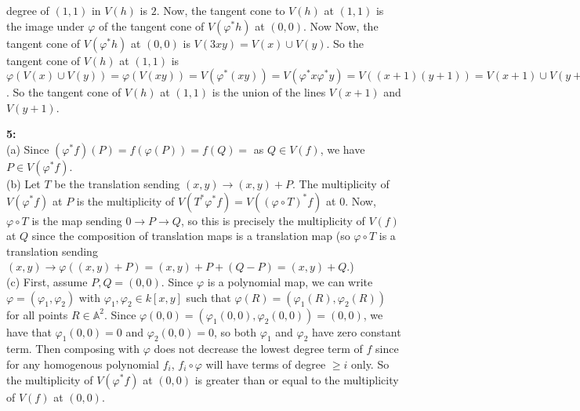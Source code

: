 \documentclass[a4paper]{article}
\begin{document}
 degree of $(1,1)$ in $V(h)$ is $2$. Now, the tangent cone
 to $V(h)$ at $(1,1)$ is
the image under $\varphi$ of the tangent cone of
$V\left( \varphi^{*}h \right) $ at $(0,0)$. Now
Now, the tangent cone of $V\left( \varphi^{*}h \right) $ at $(0,0)$ is
$V\left( 3xy \right) = V(x) \cup V(y)$. So the tangent cone of $V(h)$ at
$(1,1)$ is
$\varphi \left( V(x) \cup V(y) \right) 
= \varphi \left( V(xy) \right) = V\left( \varphi^{*}(xy) \right) 
= V\left( \varphi^{*}x \varphi^{*}y \right) 
= V\left( (x+1) (y+1) \right) = V(x+1) \cup V(y+1)
= \left\{ (x,y)  \mid x,y \in \mathbb{C}, x= -1 \lor y=-1 \right\} $.
So the tangent cone of $V(h)$ at $(1,1)$ is the union of the lines
$V(x+1)$ and $V(y+1)$.






\textbf{5:}\\
(a) Since $(\varphi^{*}f) (P) = f\left( \varphi(P) \right) 
= f(Q) = $ as $Q \in V(f)$, we have $P \in V\left( \varphi^{*}f \right) $.\\
\linebreak
(b) Let $T$ be the translation sending $(x,y) \to (x,y) + P$.
The multiplicity of $V \left( \varphi^{*}f \right) $ at $P $ is the
multiplicity of $V\left( T^{*}\varphi^{*}f \right) = V\left( \left( \varphi
\circ T \right)^{*} f \right) $ at $0$. Now,
$\varphi \circ T$ is the map sending $0 \to P \to Q$, so
this is precisely the multiplicity of $V(f)$ at $Q$ since the composition of
translation maps is a translation map (so $\varphi \circ T$ is a translation
sending $(x,y) \to \varphi ((x,y) + P) = (x,y) + P + (Q-P) = (x,y) + Q$.)\\
\linebreak
(c) First, assume $P, Q = (0,0)$. Since $\varphi$ is a polynomial map, we can
write $\varphi = \left( \varphi_1, \varphi_2 \right) $ with 
$\varphi_1, \varphi_2 \in k\left[ x,y \right] $ such that
$\varphi (R) = \left( \varphi_1 (R), \varphi_2(R) \right) $ for all points
$R \in \mathbb{A}^2$. Since $\varphi(0,0) = \left( \varphi_1 (0,0),
\varphi_2(0,0) \right)   =  (0,0)$, we have that
$\varphi_1 (0,0) = 0$ and $\varphi_2 (0,0) = 0$, so both $\varphi_1$ and
$\varphi_2$ have zero constant term. Then composing with $\varphi$ does
not decrease the lowest degree term of $f$ since for any
homogenous polynomial $f_i$, $f_i \circ \varphi$ will have terms of degree $\ge
i$ only. So the multiplicity of $V\left( \varphi^{*}f \right) $ at
$(0,0)$ is greater than or equal to the multiplicity of $V(f)$ at $(0,0)$.\\
\linebreak
\end{document}
